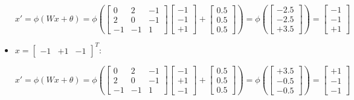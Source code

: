 \documentclass[letterpaper,headings=standardclasses]{scrartcl}
\begin{document}
\begin{itemize}
    $$ x' = \phi(Wx + \theta) = \phi \left( \left[ \begin{matrix} 0 & 2 & -1 \\ 2 & 0 & -1 \\ -1 & -1 & 1 \end{matrix} \right] \left[ \begin{matrix} -1 \\ -1 \\ +1 \end{matrix} \right] + \left[ \begin{matrix} 0.5 \\ 0.5 \\ 0.5 \end{matrix} \right] \right) = \phi \left( \left[ \begin{matrix} -2.5 \\ -2.5 \\ +3.5 \end{matrix} \right] \right) = \left[ \begin{matrix} -1 \\ -1 \\ +1 \end{matrix} \right] $$

    \item $x = [\begin{matrix} -1 & +1 & -1 \end{matrix}]^T$:
    
    $$ x' = \phi(Wx + \theta) = \phi \left( \left[ \begin{matrix} 0 & 2 & -1 \\ 2 & 0 & -1 \\ -1 & -1 & 1 \end{matrix} \right] \left[ \begin{matrix} -1 \\ +1 \\ -1 \end{matrix} \right] + \left[ \begin{matrix} 0.5 \\ 0.5 \\ 0.5 \end{matrix} \right] \right) = \phi \left( \left[ \begin{matrix} +3.5 \\ -0.5 \\ -0.5 \end{matrix} \right] \right) = \left[ \begin{matrix} +1 \\ -1 \\ -1 \end{matrix} \right] $$


\end{itemize}
\end{document}
